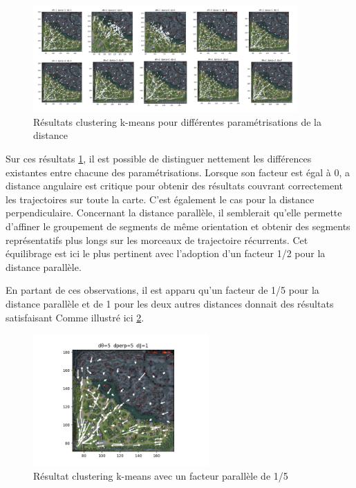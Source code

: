 \begin{figure}[h!]
    \centering
    \includegraphics[width=0.9\textwidth]{Images/kmeans/kmeans_seq.png}
    \caption{Résultats clustering k-means pour différentes paramétrisations de la distance}
    \label{fig:kmeans_seq}
\end{figure}

Sur ces résultats \ref{fig:kmeans_seq}, il est possible de distinguer nettement les différences existantes entre chacune des paramétrisations. Lorsque son facteur est égal à 0, a distance angulaire est critique pour obtenir des résultats couvrant correctement les trajectoires sur toute la carte. C'est également le cas pour la distance perpendiculaire. Concernant la distance parallèle, il semblerait qu'elle permette d'affiner le groupement de segments de même orientation et obtenir des segments représentatifs plus longs sur les morceaux de trajectoire récurrents. Cet équilibrage est ici le plus pertinent avec l'adoption d'un facteur 1/2 pour la distance parallèle.

En partant de ces observations, il est apparu qu'un facteur de 1/5 pour la distance parallèle et de 1 pour les deux autres distances donnait des résultats satisfaisant  Comme illustré ici \ref{fig:kmeans_5_5_1}.

\begin{figure}[h!]
    \centering
    \includegraphics[width=0.6\textwidth]{Images/kmeans/kmeansdBis_5_5_1.png}
    \caption{Résultat clustering k-means avec un facteur parallèle de 1/5}
    \label{fig:kmeans_5_5_1}
\end{figure}


